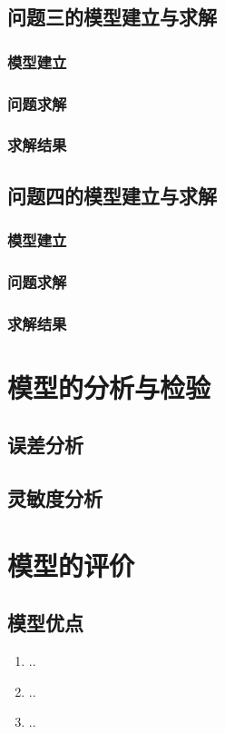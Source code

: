 \documentclass[withoutpreface,bwprint]{cumcmthesis} %
\begin{document}
\subsection{问题三的模型建立与求解}
\subsubsection{模型建立}
\subsubsection{问题求解}
\subsubsection{求解结果}


\subsection{问题四的模型建立与求解}
\subsubsection{模型建立}
\subsubsection{问题求解}
\subsubsection{求解结果}

\section{模型的分析与检验}
\subsection{误差分析}
\subsection{灵敏度分析}


\section{模型的评价}
\subsection{模型优点}
\begin{enumerate}
    \item ..
    \item ..
    \item ..
\end{enumerate}
\end{document}
